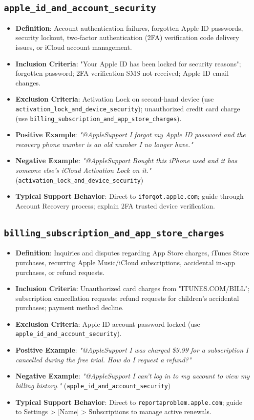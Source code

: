 \documentclass[11pt,a4paper]{article}
\begin{document}
\subsection{\texttt{apple\_id\_and\_account\_security}}
\begin{itemize}[leftmargin=*]
    \item \textbf{Definition}: Account authentication failures, forgotten Apple ID passwords, security lockout, two-factor authentication (2FA) verification code delivery issues, or iCloud account management.
    \item \textbf{Inclusion Criteria}: "Your Apple ID has been locked for security reasons"; forgotten password; 2FA verification SMS not received; Apple ID email changes.
    \item \textbf{Exclusion Criteria}: Activation Lock on second-hand device (use \texttt{activation\_lock\_and\_device\_security}); unauthorized credit card charge (use \texttt{billing\_subscription\_and\_app\_store\_charges}).
    \item \textbf{Positive Example}: \textit{"@AppleSupport I forgot my Apple ID password and the recovery phone number is an old number I no longer have."}
    \item \textbf{Negative Example}: \textit{"@AppleSupport Bought this iPhone used and it has someone else's iCloud Activation Lock on it."} (\texttt{activation\_lock\_and\_device\_security})
    \item \textbf{Typical Support Behavior}: Direct to \texttt{iforgot.apple.com}; guide through Account Recovery process; explain 2FA trusted device verification.
\end{itemize}

\subsection{\texttt{billing\_subscription\_and\_app\_store\_charges}}
\begin{itemize}[leftmargin=*]
    \item \textbf{Definition}: Inquiries and disputes regarding App Store charges, iTunes Store purchases, recurring Apple Music/iCloud subscriptions, accidental in-app purchases, or refund requests.
    \item \textbf{Inclusion Criteria}: Unauthorized card charges from "ITUNES.COM/BILL"; subscription cancellation requests; refund requests for children's accidental purchases; payment method decline.
    \item \textbf{Exclusion Criteria}: Apple ID account password locked (use \texttt{apple\_id\_and\_account\_security}).
    \item \textbf{Positive Example}: \textit{"@AppleSupport I was charged \$9.99 for a subscription I cancelled during the free trial. How do I request a refund?"}
    \item \textbf{Negative Example}: \textit{"@AppleSupport I can't log in to my account to view my billing history."} (\texttt{apple\_id\_and\_account\_security})
    \item \textbf{Typical Support Behavior}: Direct to \texttt{reportaproblem.apple.com}; guide to Settings > [Name] > Subscriptions to manage active renewals.
\end{itemize}
\end{document}
